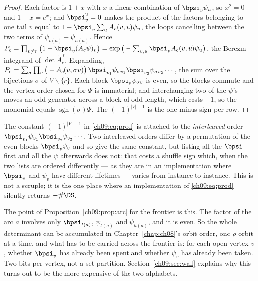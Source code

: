 \begin{proof}
Each factor is $1+x$ with $x$ a linear combination of $\bpsi_v\psi_u$, so $x^2=0$ and
$1+x=e^{x}$; and $\bpsi_v^2=0$ makes the product of the factors belonging to one tail $v$ equal
to $1-\bpsi_v\sum_u A_c(v,u)\psi_u$, the loops cancelling between the two terms of
$\psi_{t(a)}-\psi_{h(a)}$. Hence
$P_c=\prod_{v\ne r}\big(1-\bpsi_v(A_c\psi)_v\big)=\exp\big(-\sum_{v,u}\bpsi_vA_c(v,u)\psi_u\big)$,
the Berezin integrand of $\det\widetilde A^{\,r}_c$. Expanding,
$P_c=\sum_\sigma\prod_{v}\big(-A_c(v,\sigma v)\big)\,
\bpsi_{v_1}\psi_{\sigma v_1}\bpsi_{v_2}\psi_{\sigma v_2}\cdots$,
the sum over the bijections $\sigma$ of $V\smallsetminus\{r\}$. Each block $\bpsi_v\psi_{\sigma v}$
is even, so the blocks commute and the vertex order chosen for $\Psi$ is immaterial; and
interchanging two of the $\psi$'s moves an odd generator across a block of odd length, which
costs $-1$, so the monomial equals $\operatorname{sgn}(\sigma)\Psi$. The $(-1)^{|V|-1}$ is the
one minus sign per row.
\end{proof}

\begin{remark}\label{ch09:rem:interleave}
The constant $(-1)^{|V|-1}$ in \eqref{ch09:eq:prod} is attached to the \emph{interleaved} order
$\bpsi_{v_1}\psi_{v_1}\bpsi_{v_2}\psi_{v_2}\cdots$. Two interleaved orders differ by a
permutation of the even blocks $\bpsi_v\psi_v$ and so give the same constant, but listing all
the $\bpsi$ first and all the $\psi$ afterwards does not: that costs a shuffle sign which, when
the two lists are ordered differently --- as they are in an implementation where $\bpsi_v$ and
$\psi_v$ have different lifetimes --- varies from instance to instance. This is not a
scruple; it is the one place where an implementation of \eqref{ch09:eq:prod} silently returns
$-\#\DS$.
\end{remark}

The point of Proposition~\ref{ch09:prop:arc} for the frontier is this. The factor of the arc $a$
involves only $\bpsi_{t(a)}$, $\psi_{t(a)}$ and $\psi_{h(a)}$, and it is even. So the whole
determinant can be accumulated in Chapter~\ref{chap:ch08}'s orbit order, one $\rho$-orbit at a time, and what has
to be carried across the frontier is: for each open vertex $v$, whether $\bpsi_v$ has already
been spent and whether $\psi_v$ has already been taken. Two bits per vertex, not a set
partition. Section~\ref{ch09:sec:wall} explains why this turns out to be the more expensive of the
two alphabets.


